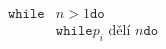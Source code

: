 \documentclass[preview]{standalone}
\begin{document}
\begin{align*}
\mathtt{while} & n > 1  \mathtt{do}  \\& \mathtt{while}  p_i \text{ dělí } n  \mathtt{do}
\end{align*}
\end{document}
